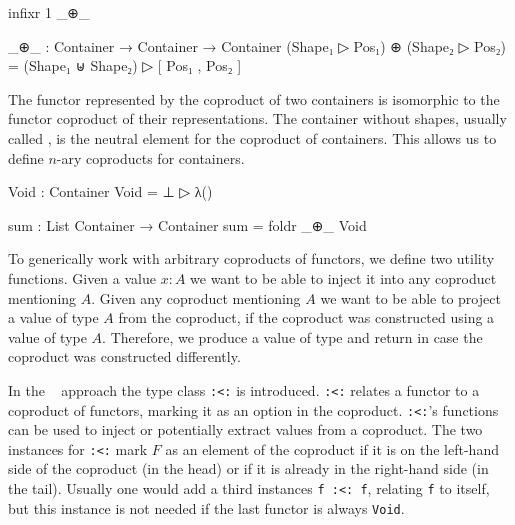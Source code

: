 \begin{code}[hide]
infixr 1 _⊕_
\end{code}
\begin{code}
_⊕_ : Container → Container → Container
(Shape₁ ▷ Pos₁) ⊕ (Shape₂ ▷ Pos₂) = (Shape₁ ⊎ Shape₂) ▷ [ Pos₁ , Pos₂ ]
\end{code}
The functor represented by the coproduct of two containers is isomorphic to the
functor coproduct of their representations.
The container without shapes, usually called , is the neutral
element for the coproduct of containers.
This allows us to define $n$-ary coproducts for containers.

\begin{code}
Void : Container
Void = ⊥ ▷ λ()

sum : List Container → Container
sum = foldr _⊕_ Void
\end{code}
To generically work with arbitrary coproducts of functors, we define two utility
functions.
Given a value $x:A$ we want to be able to inject it into any coproduct
mentioning $A$.
Given any coproduct mentioning $A$ we want to be able to project a value of
type $A$ from the coproduct, if the coproduct was constructed using a value of
type $A$.
Therefore, we produce a value of type
\AgdaSpace{} and return
 in case the coproduct was constructed
differently.

In the
~\cite{DBLP:journals/jfp/Swierstra08}
approach the type class \texttt{:<:} is introduced.
\texttt{:<:} relates a functor to a coproduct of functors, marking it as an
option in the coproduct.
\texttt{:<:}'s functions can be used to inject or potentially extract values
from a coproduct.
The two instances for \texttt{:<:} mark $F$ as an element of the coproduct if
it is on the left-hand side of the coproduct (in the head) or if it is already
in the right-hand side (in the tail).
Usually one would add a third instances \texttt{f :<: f}, relating \texttt{f} to
itself, but this instance is not needed if the last functor is always
\texttt{Void}.

